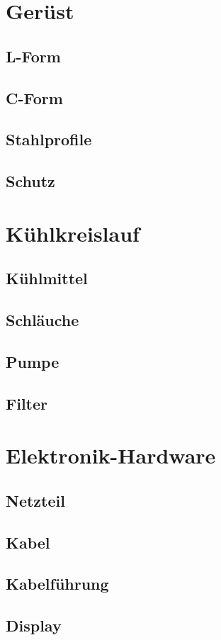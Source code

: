 \documentclass[
	a4paper,
	smallheadings,
	german,
	]
	{scrreprt}
\begin{document}
\section{Gerüst}
	\subsection{L-Form}
	\subsection{C-Form}
\subsection{Stahlprofile}
\subsection{Schutz}
\section{Kühlkreislauf}
	\subsection{Kühlmittel}
	\subsection{Schläuche}
	\subsection{Pumpe}
	\subsection{Filter}
\section{Elektronik-Hardware}
	\subsection{Netzteil}
	\subsection{Kabel}
	\subsection{Kabelführung}
	\subsection{Display}
\end{document}
